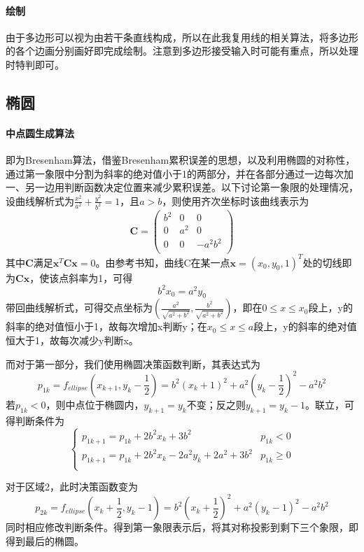 \documentclass[a4paper,UTF8]{article}
\theoremstyle{definition}
\begin{document}
\paragraph{绘制} 由于多边形可以视为由若干条直线构成，所以在此我复用线的相关算法，将多边形的各个边画分别画好即完成绘制。注意到多边形接受输入时可能有重点，所以处理时特判即可。
\subsection{椭圆}
\paragraph{中点圆生成算法} 即为Bresenham算法，借鉴Bresenham累积误差的思想，以及利用椭圆的对称性，通过第一象限中分割为斜率的绝对值小于1的两部分，并在各部分通过一边每次加一、另一边用判断函数决定位置来减少累积误差。以下讨论第一象限的处理情况，设曲线解析式为$\frac{x^2}{a^2}+\frac{y^2}{b^2}=1$，且$a>b$，则使用齐次坐标时该曲线表示为
\begin{equation}
\mathbf{C}=\left(
\begin{array}{ccc}
b^2 & 0 & 0 \\
0 & a^2 & 0 \\
0 & 0 & -a^2b^2 \\
\end{array}
\right)
\end{equation}
其中$\mathbf{C}$满足$\mathbf{x}^T\mathbf{C}\mathbf{x}=0$。由参考书知，曲线C在某一点$\mathbf{x}=(x_0,y_0,1)^T$处的切线即为$\mathbf{Cx}$，使该点斜率为1，可得
\begin{equation}
b^2x_0=a^2y_0
\end{equation}
带回曲线解析式，可得交点坐标为$(\frac{a^2}{\sqrt{a^2+b^2}},\frac{b^2}{\sqrt{a^2+b^2}})$，即在$0\leq x\leq x_0$段上，y的斜率的绝对值恒小于1，故每次增加x判断y；在$x_0\leq x\leq a$段上，y的斜率的绝对值恒大于1，故每次减少y判断x。
\par 而对于第一部分，我们使用椭圆决策函数判断，其表达式为
\begin{equation}
p_{1k}=f_{ellipse}(x_{k+1},y_k-\frac{1}{2})=b^2(x_k+1)^2+a^2(y_k-\frac{1}{2})^2-a^2b^2
\end{equation}
若$p_{1k}<0$，则中点位于椭圆内，$y_{k+1}=y_{k}$不变；反之则$y_{k+1}=y_k-1$。联立，可得判断条件为
\begin{equation}
\left\{
\begin{array}{ll}
p_{1k+1}=p_{1k}+2b^2x_k+3b^2 & p_{1k}<0 \\
p_{1k+1}=p_{1k}+2b^2x_k-2a^2y_k+2a^2+3b^2 & p_{1k}\geq 0 \\
\end{array}
\right.
\end{equation}
\par 对于区域2，此时决策函数变为
\begin{equation}
p_{2k}=f_{ellipse}(x_{k}+\frac{1}{2},y_k-1)=b^2(x_k+\frac{1}{2})^2+a^2(y_k-1)^2-a^2b^2
\end{equation}
同时相应修改判断条件。得到第一象限表示后，将其对称投影到剩下三个象限，即得到最后的椭圆。
\end{document}
